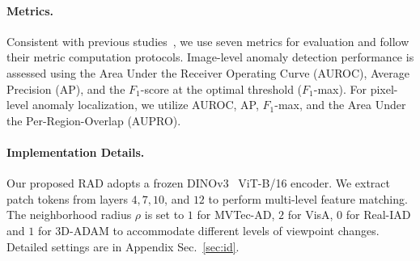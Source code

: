 \documentclass{article}
\theoremstyle{plain}
\theoremstyle{definition}
\theoremstyle{remark}
\begin{document}
\paragraph{Metrics.} Consistent with previous studies~\cite{he2024mambaad,he2024diffusion,fengomiad,guo2025dinomaly}, we use seven metrics for evaluation and follow their metric computation protocols. Image-level anomaly detection performance is assessed using the Area Under the Receiver Operating Curve (AUROC), Average Precision (AP), and the $F_1$-score at the optimal threshold ($F_1$-max). For pixel-level anomaly localization, we utilize AUROC, AP, $F_1$-max, and the Area Under the Per-Region-Overlap (AUPRO).
\paragraph{Implementation Details.} Our proposed RAD adopts a frozen DINOv3~\cite{simeoni2025dinov3} ViT-B/16 encoder. We extract patch tokens from layers $4, 7, 10$, and $12$ to perform multi-level feature matching. The neighborhood radius $\rho$ is set to $1$ for MVTec-AD, $2$ for VisA, $0$ for Real-IAD and $1$ for 3D-ADAM to accommodate different levels of viewpoint changes. Detailed settings are in Appendix Sec.~\ref{sec:id}.

\end{document}
